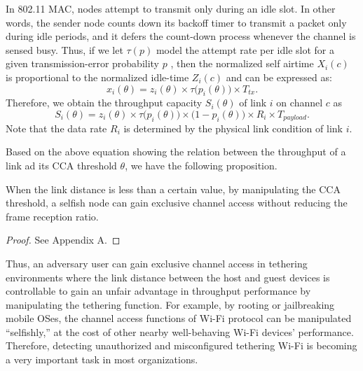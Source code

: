 {In 802.11 MAC, nodes attempt to transmit only during an idle slot.
In other words, the sender node counts down its backoff timer
to transmit a packet only during idle periods, and it defers the
count-down process whenever the channel is sensed busy.
Thus, if we let $\tau(p)$ model the attempt rate per idle slot for
a given transmission-error probability $p$ \cite{Kumar:07Fixed},
then the normalized self airtime ${X}_i(c)$ is proportional to
the normalized idle-time ${Z}_i(c)$ and can be expressed as:
\begin{equation}
{x}_i(\theta) = {z}_i(\theta) \times \tau\big(p_i(\theta)\big) \times T_{tx}.
\end{equation}
%
Therefore, we obtain the throughput capacity $S_i(\theta)$ of link $i$
on channel $c$ as
\begin{equation}\label{eq:linkcapacity}
S_i(\theta) =  {z}_i(\theta) \times \tau\big(p_i(\theta)\big) \times \Big(1 - p_i(\theta)\Big)
\times R_i \times T_{payload}.
\end{equation}
%
Note that the data rate $R_i$ is determined by the
physical link condition of link $i$.

Based on the above equation showing the relation between the throughput
of a link ad its CCA threshold $\theta$, we have the following proposition.

\begin{proposition}[Proposition 1]
When the link distance is less than a certain value, by manipulating
the CCA threshold, a selfish node can gain exclusive channel access
without reducing the frame reception ratio.
\end{proposition}
\begin{proof}
See Appendix A.
\end{proof}

Thus, an adversary user can  gain exclusive channel access in
tethering environments where the link distance between the host and
guest devices is controllable to gain an unfair advantage in
throughput performance by manipulating the tethering function.
For example, by rooting or jailbreaking mobile OSes, the channel
access functions of Wi-Fi protocol can be manipulated ``selfishly,''
at the cost of other nearby well-behaving Wi-Fi devices' performance.
Therefore, detecting unauthorized and misconfigured tethering Wi-Fi
is becoming a very important task in most organizations.

} %
